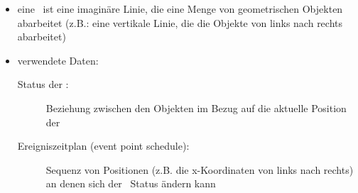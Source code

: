 \vspace*{0.25\baselineskip}
\begin{itemize}
	\item eine \sweep~ist eine imaginäre Linie, die eine Menge von geometrischen Objekten abarbeitet (z.B.: eine vertikale Linie, die die Objekte von links nach rechts abarbeitet)
	\item verwendete Daten:
		\begin{description}
			\item[Status der \sweep:] Beziehung zwischen den Objekten im Bezug auf die aktuelle Position der \sweep
			\item[Ereigniszeitplan (event point schedule):] Sequenz von Positionen (z.B. die x-Koordinaten von links nach rechts) an denen sich der \sweep~Status ändern kann
		\end{description}
\end{itemize}


